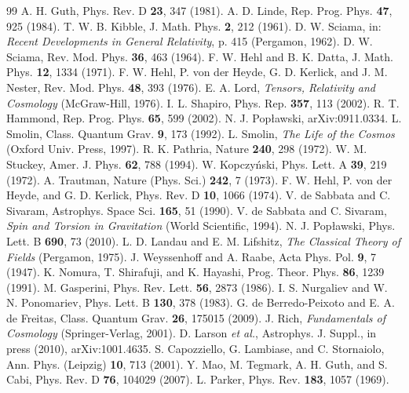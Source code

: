 \documentclass[prd,onecolumn,nofootinbib,showkeys]{revtex4}
\begin{document}
\begin{thebibliography}{99}
 A. H. Guth, Phys. Rev. D {\bf 23}, 347 (1981).
 A. D. Linde, Rep. Prog. Phys. {\bf 47}, 925 (1984).
 T. W. B. Kibble, J. Math. Phys. {\bf 2}, 212 (1961).
 D. W. Sciama, in: {\em Recent Developments in General Relativity}, p. 415 (Pergamon, 1962).
 D. W. Sciama, Rev. Mod. Phys. {\bf 36}, 463 (1964).
 F. W. Hehl and B. K. Datta, J. Math. Phys. {\bf 12}, 1334 (1971).
 F. W. Hehl, P. von der Heyde, G. D. Kerlick, and J. M. Nester, Rev. Mod. Phys. {\bf 48}, 393 (1976).
 E. A. Lord, {\em Tensors, Relativity and Cosmology} (McGraw-Hill, 1976).
 I. L. Shapiro, Phys. Rep. {\bf 357}, 113 (2002).
 R. T. Hammond, Rep. Prog. Phys. {\bf 65}, 599 (2002).
 N. J. Pop{\l}awski, arXiv:0911.0334.
 L. Smolin, Class. Quantum Grav. {\bf 9}, 173 (1992).
 L. Smolin, {\em The Life of the Cosmos} (Oxford Univ. Press, 1997).
 R. K. Pathria, Nature {\bf 240}, 298 (1972).
 W. M. Stuckey, Amer. J. Phys. {\bf 62}, 788 (1994).
 W. Kopczy\'{n}ski, Phys. Lett. A {\bf 39}, 219 (1972).
 A. Trautman, Nature (Phys. Sci.) {\bf 242}, 7 (1973).
 F. W. Hehl, P. von der Heyde, and G. D. Kerlick, Phys. Rev. D {\bf 10}, 1066 (1974).
 V. de Sabbata and C. Sivaram, Astrophys. Space Sci. {\bf 165}, 51 (1990).
 V. de Sabbata and C. Sivaram, {\em Spin and Torsion in Gravitation} (World Scientific, 1994).
 N. J. Pop{\l}awski, Phys. Lett. B {\bf 690}, 73 (2010).
 L. D. Landau and E. M. Lifshitz, {\em The Classical Theory of Fields} (Pergamon, 1975).
 J. Weyssenhoff and A. Raabe, Acta Phys. Pol. {\bf 9}, 7 (1947).
 K. Nomura, T. Shirafuji, and K. Hayashi, Prog. Theor. Phys. {\bf 86}, 1239 (1991).
 M. Gasperini, Phys. Rev. Lett. {\bf 56}, 2873 (1986).
 I. S. Nurgaliev and W. N. Ponomariev, Phys. Lett. B {\bf 130}, 378 (1983).
 G. de Berredo-Peixoto and E. A. de Freitas, Class. Quantum Grav. {\bf 26}, 175015 (2009).
 J. Rich, {\it Fundamentals of Cosmology} (Springer-Verlag, 2001).
 D. Larson {\it et al.}, Astrophys. J. Suppl., in press (2010), arXiv:1001.4635.
 S. Capozziello, G. Lambiase, and C. Stornaiolo, Ann. Phys. (Leipzig) {\bf 10}, 713 (2001).
 Y. Mao, M. Tegmark, A. H. Guth, and S. Cabi, Phys. Rev. D {\bf 76}, 104029 (2007).
 L. Parker, Phys. Rev. {\bf 183}, 1057 (1969).

\end{thebibliography}
\end{document}
